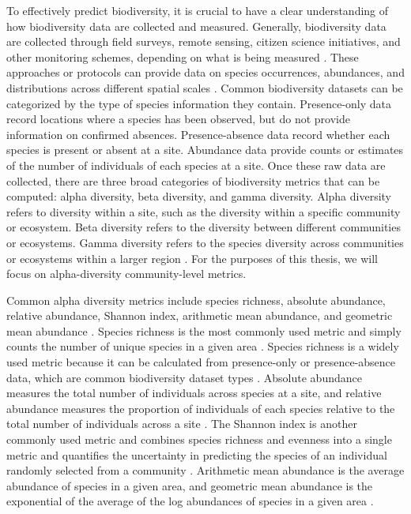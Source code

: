 To effectively predict biodiversity, it is crucial to have a clear understanding of how biodiversity data are collected and measured. Generally, biodiversity data are collected through field surveys, remote sensing, citizen science initiatives, and other monitoring schemes, depending on what is being measured \parencite{proenca2017, beery2021,brun2024}. These approaches or protocols can provide data on species occurrences, abundances, and distributions across different spatial scales \parencite{proenca2017}. Common biodiversity datasets can be categorized by the type of species information they contain. Presence-only data record locations where a species has been observed, but do not provide information on confirmed absences. Presence-absence data record whether each species is present or absent at a site. Abundance data provide counts or estimates of the number of individuals of each species at a site. Once these raw data are collected, there are three broad categories of biodiversity metrics that can be computed: alpha diversity, beta diversity, and gamma diversity. Alpha diversity refers to diversity within a site, such as the diversity within a specific community or ecosystem. Beta diversity refers to the diversity between different communities or ecosystems. Gamma diversity refers to the species diversity across communities or ecosystems within a larger region \parencite{andermann2022}. For the purposes of this thesis, we will focus on alpha-diversity community-level metrics.

Common alpha diversity metrics include species richness, absolute abundance, relative abundance, Shannon index, arithmetic mean abundance, and geometric mean abundance \parencite{santini2017, beery2021}. Species richness is the most commonly used metric and simply counts the number of unique species in a given area \parencite{ferrier2006}. Species richness is a widely used metric because it can be calculated from presence-only or presence-absence data, which are common biodiversity dataset types \parencite{ozkan_tumer_two_2026}. Absolute abundance measures the total number of individuals across species at a site, and relative abundance measures the proportion of individuals of each species relative to the total number of individuals across a site \parencite{beery2021}. The Shannon index is another commonly used metric and combines species richness and evenness into a single metric and quantifies the uncertainty in predicting the species of an individual randomly selected from a community \parencite{beery2021}. Arithmetic mean abundance is the average abundance of species in a given area, and geometric mean abundance is the exponential of the average of the log abundances of species in a given area \parencite{santini2017}.

